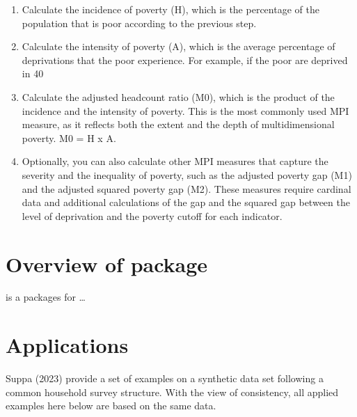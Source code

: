 \begin{enumerate}
\[ \mathbf{D} = 
\begin{blockarray}{ccccc}
CM & N & YS & H \\
\begin{block}{(cccc)c}
  1 & 1 & 0 & 1 & f \\
  0 & 1 & 0 & 0 & g \\
  0 & 0 & 1 & 0 & h \\
  0 & 1 & 0 & 1 & i \\
  0 & 0 & 0 & 0 & j \\
\end{block}
\end{blockarray}
\]
\item Calculate the incidence of poverty (H), which is the percentage of the population that is poor according to the previous step.
\item Calculate the intensity of poverty (A), which is the average percentage of deprivations that the poor experience. For example, if the poor are deprived in 40%
\item Calculate the adjusted headcount ratio (M0), which is the product of the incidence and the intensity of poverty. This is the most commonly used MPI measure, as it reflects both the extent and the depth of multidimensional poverty. M0 = H x A.
\item Optionally, you can also calculate other MPI measures that capture the severity and the inequality of poverty, such as the adjusted poverty gap (M1) and the adjusted squared poverty gap (M2). These measures require cardinal data and additional calculations of the gap and the squared gap between the level of deprivation and the poverty cutoff for each indicator.
\end{enumerate}

\hypertarget{overview-of-package}{%
\section{\texorpdfstring{Overview of  package}{Overview of  package}}\label{overview-of-package}}

 is a packages for \ldots{}

\hypertarget{applications}{%
\section{Applications}\label{applications}}

Suppa (2023) provide a set of examples on a synthetic data set following a common household survey structure. With the view of consistency, all applied examples here below are based on the same data.


